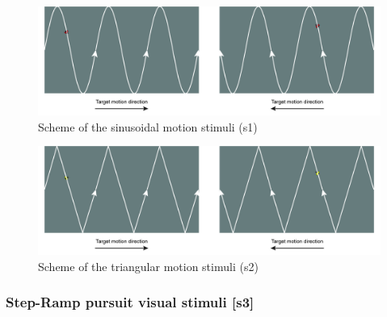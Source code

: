 \begin{figure}[h]
  \centering
  \includegraphics[width=.9\textwidth]{figures/stimulitarget-09.jpg}
  \caption[Sinusoidal stimuli screenshots]{Scheme of the sinusoidal motion stimuli (s1)}
  \label{fig:sinescreens}
\end{figure}

\begin{figure}[h]
  \centering
  \includegraphics[width=.9\textwidth]{figures/stimulitarget-10.jpg}
  \caption[Triangular stimuli screenshots]{Scheme of the triangular motion stimuli (s2)}
  \label{fig:triangscreens}
\end{figure}




\subsubsection{Step-Ramp pursuit visual stimuli [s3]}
\label{sec:expstepramp}

